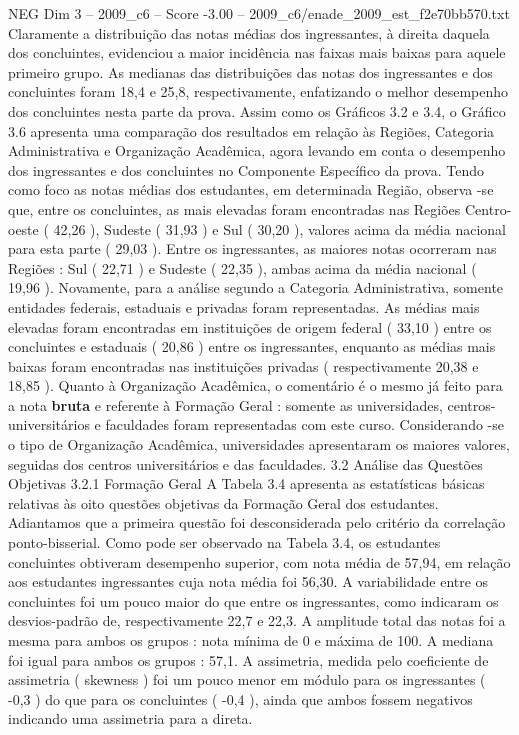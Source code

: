 \begin{textsample}{NEG Dim 3 – 2009\_c6 – Score -3.00 – 2009\_c6/enade\_2009\_est\_f2e70bb570.txt}
Claramente a distribuição das notas médias dos ingressantes, à direita daquela dos concluintes, evidenciou a maior incidência nas faixas mais baixas para aquele primeiro grupo.
As medianas das distribuições das notas dos ingressantes e dos concluintes foram 18,4 e 25,8, respectivamente, enfatizando o melhor desempenho dos concluintes nesta parte da prova.
Assim como os Gráficos 3.2 e 3.4, o Gráfico 3.6 apresenta uma comparação dos resultados em relação às Regiões, Categoria Administrativa e Organização Acadêmica, agora levando em conta o desempenho dos ingressantes e dos concluintes no Componente Específico da prova.
Tendo como foco as notas médias dos estudantes, em determinada Região, observa -se que, entre os concluintes, as mais elevadas foram encontradas nas Regiões Centro-oeste ( 42,26 ), Sudeste ( 31,93 ) e Sul ( 30,20 ), valores acima da média nacional para esta parte ( 29,03 ).
Entre os ingressantes, as maiores notas ocorreram nas Regiões : Sul ( 22,71 ) e Sudeste ( 22,35 ), ambas acima da média nacional ( 19,96 ).
Novamente, para a análise segundo a Categoria Administrativa, somente entidades federais, estaduais e privadas foram representadas.
As médias mais elevadas foram encontradas em instituições de origem federal ( 33,10 ) entre os concluintes e estaduais ( 20,86 ) entre os ingressantes, enquanto as médias mais baixas foram encontradas nas instituições privadas ( respectivamente 20,38 e 18,85 ).
Quanto à Organização Acadêmica, o comentário é o mesmo já feito para a nota \textbf{bruta} e referente à Formação Geral : somente as universidades, centros-universitários e faculdades foram representadas com este curso.
Considerando -se o tipo de Organização Acadêmica, universidades apresentaram os maiores valores, seguidas dos centros universitários e das faculdades. 3.2 Análise das Questões Objetivas 3.2.1 Formação Geral A Tabela 3.4 apresenta as estatísticas básicas relativas às oito questões objetivas da Formação Geral dos estudantes.
Adiantamos que a primeira questão foi desconsiderada pelo critério da correlação ponto-bisserial.
Como pode ser observado na Tabela 3.4, os estudantes concluintes obtiveram desempenho superior, com nota média de 57,94, em relação aos estudantes ingressantes cuja nota média foi 56,30.
A variabilidade entre os concluintes foi um pouco maior do que entre os ingressantes, como indicaram os desvios-padrão de, respectivamente 22,7 e 22,3.
A amplitude total das notas foi a mesma para ambos os grupos : nota mínima de 0 e máxima de 100.
A mediana foi igual para ambos os grupos : 57,1.
A assimetria, medida pelo coeficiente de assimetria ( skewness ) foi um pouco menor em módulo para os ingressantes ( -0,3 ) do que para os concluintes ( -0,4 ), ainda que ambos fossem negativos indicando uma assimetria para a direta.

\end{textsample}
